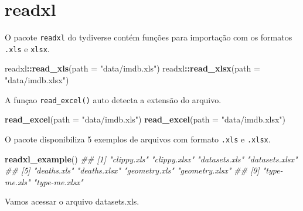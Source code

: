 \documentclass[]{book}
\newenvironment{Shaded}{\begin{snugshade}}{\end{snugshade}}
\newcommand{\CommentTok}[1]{\textcolor[rgb]{0.56,0.35,0.01}{\textit{#1}}}
\newcommand{\DataTypeTok}[1]{\textcolor[rgb]{0.13,0.29,0.53}{#1}}
\newcommand{\KeywordTok}[1]{\textcolor[rgb]{0.13,0.29,0.53}{\textbf{#1}}}
\newcommand{\NormalTok}[1]{#1}
\newcommand{\OperatorTok}[1]{\textcolor[rgb]{0.81,0.36,0.00}{\textbf{#1}}}
\newcommand{\StringTok}[1]{\textcolor[rgb]{0.31,0.60,0.02}{#1}}
\begin{document}
\hypertarget{readxl}{%
\section{readxl}\label{readxl}}

O pacote \texttt{readxl} do tydiverse contém funções para importação com os formatos \texttt{.xls} e \texttt{xlsx}.

\begin{Shaded}
\begin{Highlighting}[]
\NormalTok{readxl}\OperatorTok{::}\KeywordTok{read_xls}\NormalTok{(}\DataTypeTok{path =} \StringTok{"data/imdb.xls"}\NormalTok{)}
\NormalTok{readxl}\OperatorTok{::}\KeywordTok{read_xlsx}\NormalTok{(}\DataTypeTok{path =} \StringTok{"data/imdb.xlsx"}\NormalTok{)}
\end{Highlighting}
\end{Shaded}

A funçao \texttt{read\_excel()} auto detecta a extensão do arquivo.

\begin{Shaded}
\begin{Highlighting}[]
\KeywordTok{read_excel}\NormalTok{(}\DataTypeTok{path =} \StringTok{"data/imdb.xls"}\NormalTok{)}
\KeywordTok{read_excel}\NormalTok{(}\DataTypeTok{path =} \StringTok{"data/imdb.xlsx"}\NormalTok{)}
\end{Highlighting}
\end{Shaded}

O pacote disponibiliza 5 exemplos de arquivos com formato \texttt{.xls} e \texttt{.xlsx}.

\begin{Shaded}
\begin{Highlighting}[]
\KeywordTok{readxl_example}\NormalTok{()}
\CommentTok{##  [1] "clippy.xls"    "clippy.xlsx"   "datasets.xls"  "datasets.xlsx"}
\CommentTok{##  [5] "deaths.xls"    "deaths.xlsx"   "geometry.xls"  "geometry.xlsx"}
\CommentTok{##  [9] "type-me.xls"   "type-me.xlsx"}
\end{Highlighting}
\end{Shaded}

Vamos acessar o arquivo datasets.xls.
\end{document}
